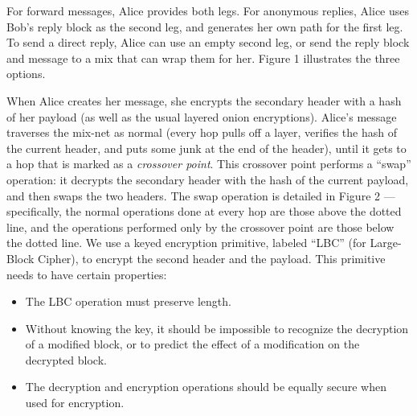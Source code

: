 \documentclass[11pt]{IEEEtran}
\begin{document}
For forward messages, Alice provides both legs. For anonymous replies, Alice
uses Bob's reply block as the second leg, and generates her own path
for the first leg.  To send a direct reply, Alice can use an empty
second leg, or send the reply block and message to a mix that can wrap
them for her. Figure 1 illustrates the three options.

When Alice creates her message, she encrypts the secondary header with a hash
of her payload (as well as the usual layered onion encryptions). Alice's
message traverses the mix-net as normal (every hop pulls off a layer,
verifies the hash of the current header, and puts some junk at the end of the
header), until it gets to a hop that is marked as a \emph{crossover
  point}. This crossover point performs a ``swap'' operation: it decrypts the
secondary header with the hash of the current payload, and then swaps the two
headers. The swap operation is detailed in Figure 2 --- specifically, the
normal operations done at every hop are those above the dotted line, and the
operations performed only by the crossover point are those below the dotted
line.  We use a keyed encryption primitive, labeled ``LBC'' (for Large-Block
Cipher), to encrypt the second header and the payload.  This primitive needs
to have certain properties:

\begin{itemize}
\item The LBC operation must preserve length.
\item Without knowing the key, it should be impossible to recognize the
   decryption of a modified block, or to predict the effect of a modification
   on the decrypted block.
\item The decryption and encryption operations should be equally secure when
  used for encryption.
\end{itemize}
\end{document}
